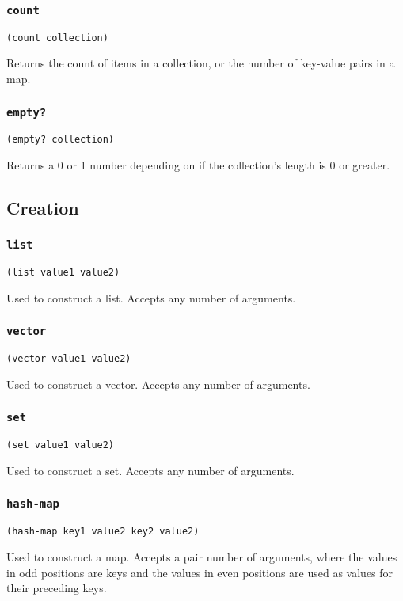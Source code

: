\documentclass[11pt]{scrreprt}
\begin{document}
\subsubsection{\texttt{count}}
\begin{verbatim}
(count collection)
\end{verbatim}
Returns the count of items in a collection, or the number of key-value pairs in a map.

\subsubsection{\texttt{empty?}}
\begin{verbatim}
(empty? collection)
\end{verbatim}
Returns a 0 or 1 number depending on if the collection's length is 0 or greater.


\subsection{Creation}
\subsubsection{\texttt{list}}
\begin{verbatim}
(list value1 value2)
\end{verbatim}
Used to construct a list. Accepts any number of arguments.

\subsubsection{\texttt{vector}}
\begin{verbatim}
(vector value1 value2)
\end{verbatim}
Used to construct a vector. Accepts any number of arguments.

\subsubsection{\texttt{set}}
\begin{verbatim}
(set value1 value2)
\end{verbatim}
Used to construct a set. Accepts any number of arguments.

\subsubsection{\texttt{hash-map}}
\begin{verbatim}
(hash-map key1 value2 key2 value2)
\end{verbatim}
Used to construct a map. Accepts a pair number of arguments, where the values in odd positions are keys and the values in even positions are used as values for their preceding keys.
\end{document}
